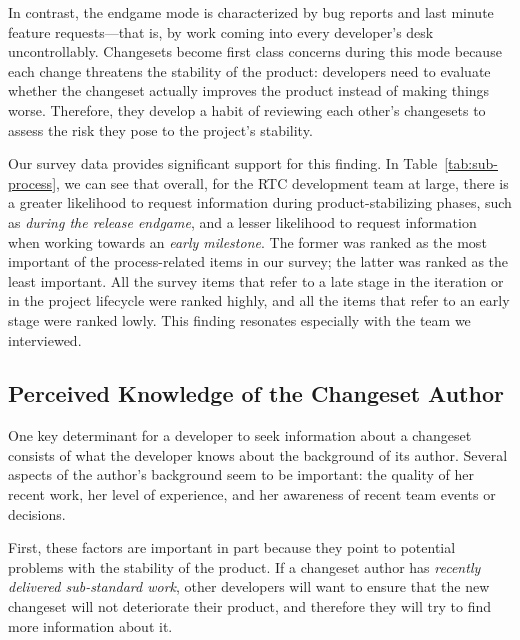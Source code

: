\documentclass[12pt,oneside]{book}
\begin{document}
In contrast, the endgame mode is characterized by bug reports and last minute feature requests---that is, by work coming into every developer's desk uncontrollably. Changesets become first class concerns during this mode because each change threatens the stability of the product: developers need to evaluate whether the changeset actually improves the product instead of making things worse. Therefore, they develop a habit of reviewing each other's changesets to assess the risk they pose to the project's stability.

Our survey data provides significant support for this finding. In Table~\ref{tab:sub-process}, we can see that overall, for the RTC development team at large, there is a greater likelihood to request information during product-stabilizing phases, such as 
\emph{during the release endgame}, and a lesser likelihood to request information when working towards an \emph{early milestone}. The former was ranked as the most important of the process-related items in our survey; the latter was ranked as the least important. All the survey items that refer to a late stage in the iteration or in the project lifecycle were ranked highly, and all the items that refer to an early stage were ranked lowly. This finding resonates especially with the team we interviewed. 




\subsection{Perceived Knowledge of the Changeset Author}

One key determinant for a developer to seek information about a changeset consists of what the developer knows about the background of its author. Several aspects of the author's background seem to be important: the quality of her recent work, her level of experience, and her awareness of recent team events or decisions.

First, these factors are important in part because they point to potential problems with the stability of the product. If a changeset author has \emph{recently delivered sub-standard work}, other developers will want to ensure that the new changeset will not deteriorate their product, and therefore they will try to find more information about it.
\end{document}
